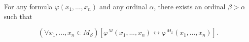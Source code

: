For any formula $\varphi(x_1, \ldots, x_n)$ and any ordinal $\alpha$, there exists an ordinal $\beta > \alpha$ such that

$$(\forall x_1, \ldots, x_n \in M_\beta)[\varphi^{M}(x_1, \ldots, x_n) \leftrightarrow \varphi^{M_\beta}(x_1, \ldots, x_n)].$$
